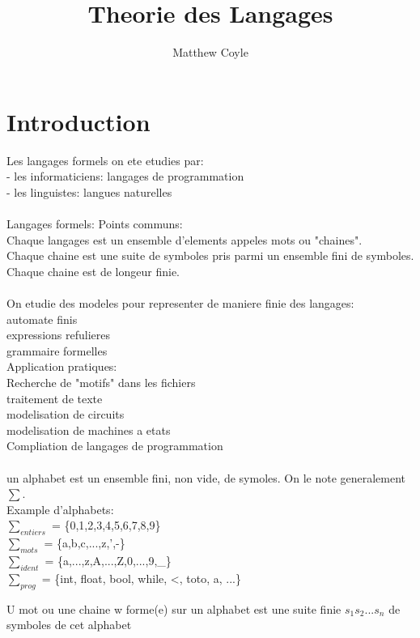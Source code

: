 \documentclass{article}
\author{Matthew Coyle}
\title{Theorie des Langages}
\begin{document}
\maketitle

\section{Introduction}

Les langages formels on ete etudies par:\\
- les informaticiens: langages de programmation\\
- les linguistes: langues naturelles\\
\\
Langages formels: Points communs:\\
Chaque langages est un ensemble d'elements appeles mots ou "chaines".\\
Chaque chaine est une suite de symboles pris parmi un ensemble fini de symboles.\\
Chaque chaine est de longeur finie.\\
\\
On etudie des modeles pour representer de maniere finie des langages:\\
automate finis\\
expressions refulieres\\
grammaire formelles\\

Application pratiques:\\
Recherche de "motifs" dans les fichiers\\
traitement de texte\\
modelisation de circuits\\
modelisation de machines a etats\\
Compliation de langages de programmation\\
\\

un alphabet est un ensemble fini, non vide, de symoles. On le note generalement $\sum$.\\
Example d'alphabets:\\
$\sum_{entiers}$ = \{0,1,2,3,4,5,6,7,8,9\}\\
$\sum_{mots}$ = \{a,b,c,...,z,',-\}\\
$\sum_{ident}$ = \{a,...,z,A,...,Z,0,...,9,\_\}\\
$\sum_{prog}$ = \{int, float, bool, while, <, toto, a, ...\}

U mot ou une chaine w forme(e) sur un alphabet est une suite finie $s_1 s_2 ... s_n$ de symboles de cet alphabet\\
\end{document}
